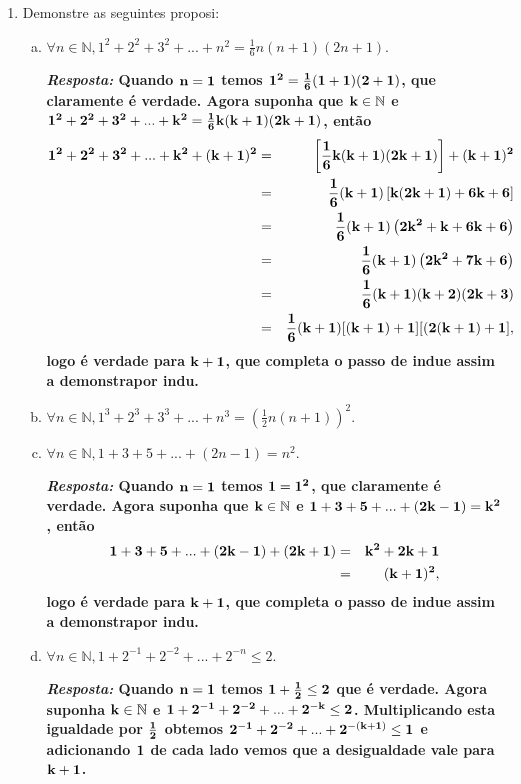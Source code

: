 \begin{enumerate}[{\bf 1.}]
\item Demonstre as seguintes proposi\cois:
\begin{enumerate}[a)]
\item $\forall n\in\mathbb{N}, 1^2+2^2+3^2+...+n^2=\frac{1}{6}n(n+1)(2n+1)$.

{\bf{\it Resposta:} Quando ${\bf n=1}$ temos ${\bf 1^2=\frac{1}{6}(1+1)(2+1)}$, que claramente é verdade. Agora suponha que ${\bf k\in\mathbb{N}}$ e ${\bf 1^2+2^2+3^2+...+k^2=\frac{1}{6}k(k+1)(2k+1)}$, então
\begin{eqnarray*}
{\bf 1^2+2^2+3^2+...+k^2+(k+1)^2}&=&{\bf  \left[\frac{1}{6}k(k+1)(2k+1)\right]+(k+1)^2}\\
                          &=&{\bf  \frac{1}{6}(k+1)\left[k(2k+1)+6k+6\right]}\\
                          &=&{\bf  \frac{1}{6}(k+1)\left(2k^2+k+6k+6\right)}\\
                          &=&{\bf  \frac{1}{6}(k+1)\left(2k^2+7k+6\right)}\\
                          &=&{\bf  \frac{1}{6}(k+1)(k+2)(2k+3)}\\
                          &=&{\bf  \frac{1}{6}(k+1)[(k+1)+1][(2(k+1)+1]},
\end{eqnarray*}  
logo \'e verdade para ${\bf k+1}$, que completa o passo de indu\cao e assim a demonstra\cao por indu\caoi.}

\item $\forall n\in\mathbb{N}, 1^3+2^3+3^3+...+n^3=(\frac{1}{2}n(n+1))^2$.
\item $\forall n\in\mathbb{N}, 1+3+5+...+(2n-1)=n^2$.

{\bf{\it Resposta:} Quando ${\bf n=1}$ temos ${\bf 1=1^2}$, que claramente é verdade. Agora suponha que ${\bf k\in\mathbb{N}}$ e ${\bf 1+3+5+...+(2k-1)=k^2}$, então
\begin{eqnarray*}
{\bf 1+3+5+...+(2k-1)+(2k+1)}&=&{\bf  k^2+2k+1}\\
                          &=&{\bf  (k+1)^2},
\end{eqnarray*}  
logo \'e verdade para ${\bf k+1}$, que completa o passo de indu\cao e assim a demonstra\cao por indu\caoi.}

\item $\forall n\in\mathbb{N}, 1+2^{-1}+2^{-2}+...+2^{-n}\leq 2$.

{\bf{\it Resposta:} Quando ${\bf n=1}$ temos ${\bf 1+\frac{1}{2}\leq 2}$ que \'e verdade. Agora suponha ${\bf k\in\mathbb{N}}$ e ${\bf 1+2^{-1}+2^{-2}+...+2^{-k}\leq 2}$. Multiplicando esta igualdade por ${\bf \frac{1}{2}}$ obtemos ${\bf 2^{-1}+2^{-2}+...+2^{-(k+1)}\leq 1}$ e adicionando ${\bf 1}$ de cada lado vemos que a desigualdade vale para ${\bf k+1}$.}


\end{enumerate}
\end{enumerate}
